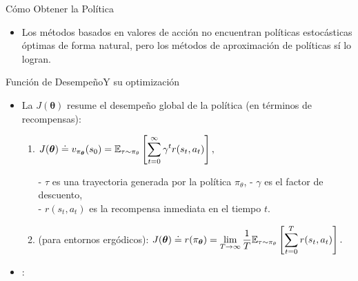 \documentclass[10pt, envcountsect, handout, aspectratio=1610, hyperref={hypertexnames=true}]{beamer}
\begin{document}
\begin{frame}{Cómo Obtener la Política}
\begin{itemize}
\begin{itemize}
			\begin{itemize}
				\item Los métodos basados en valores de acción no encuentran políticas estocásticas óptimas de forma natural, pero los métodos de aproximación de políticas sí lo logran.
			\end{itemize}
		\end{itemize}
		
	\end{itemize}
\end{frame}



\begin{frame}{Función de Desempeño}{Y su optimización}
	
	
	\begin{itemize}
		\item La  $J(\bm{\theta})$  resume el desempeño global de la política (en términos de recompensas):
		\begin{enumerate}
			\item {}
			$ \displaystyle 
			J(\bm{\theta}) \doteq v_{\pi_{\bm{\theta}}} (s_0) = \mathbb{E}_{\tau \sim \pi_\theta} \left[ \sum_{t=0}^\infty \gamma^t r(s_t, a_t) \right],
			$
			
				- \( \tau \) es una trayectoria generada por la política \( \pi_\theta \),
				- \( \gamma \) es el factor de descuento, \\
				 - \( r(s_t, a_t) \) es la recompensa inmediata en el tiempo \( t \).
			\item {} (para entornos ergódicos):
			$\displaystyle
			J(\bm{\theta}) \doteq r(\pi_{\bm{\theta}}) = \lim_{T \to \infty} \frac{1}{T} \mathbb{E}_{\tau \sim \pi_\theta} \left[ \sum_{t=0}^T r(s_t, a_t) \right].
			$
		\end{enumerate}
		

		
		\item {}: \hfil 


\end{itemize}
\end{frame}
\end{document}
